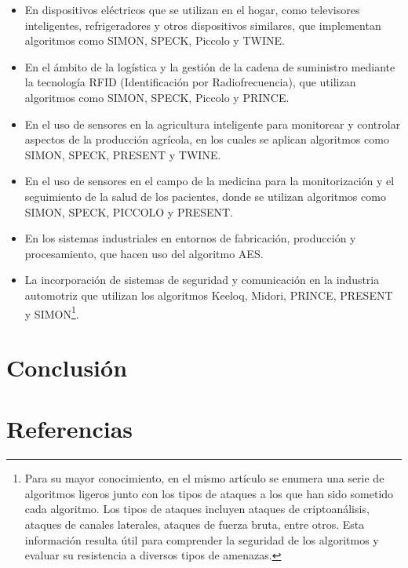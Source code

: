 \documentclass[a4paper,10pt]{article}
\begin{document}
	\begin{itemize}
		\item En dispositivos eléctricos que se utilizan en el hogar, como televisores inteligentes, refrigeradores y otros dispositivos similares, que implementan algoritmos como SIMON, SPECK, Piccolo y TWINE. 
		\item En el ámbito de la logística y la gestión de la cadena de suministro mediante la tecnología RFID (Identificación por Radiofrecuencia), que utilizan algoritmos como SIMON, SPECK, Piccolo y PRINCE.
		\item En el uso de sensores en la agricultura inteligente para monitorear y controlar aspectos de la producción agrícola, en los cuales se aplican algoritmos como SIMON, SPECK, PRESENT y TWINE.
		\item En el uso de sensores en el campo de la medicina para la monitorización y el seguimiento de la salud de los pacientes, donde se utilizan algoritmos como SIMON, SPECK, PICCOLO y PRESENT.
		\item En los sistemas industriales en entornos de fabricación, producción y procesamiento, que hacen uso del algoritmo AES.
		\item La incorporación de sistemas de seguridad y comunicación en la industria automotriz que utilizan los algoritmos Keeloq, Midori, PRINCE, PRESENT y SIMON\footnote{Para su mayor conocimiento, en el mismo artículo se enumera una serie de algoritmos ligeros junto con los tipos de ataques a los que han sido sometido cada algoritmo. Los tipos de ataques incluyen ataques de criptoanálisis, ataques de canales laterales, ataques de fuerza bruta, entre otros. Esta información resulta útil para comprender la seguridad de los algoritmos y evaluar su resistencia a diversos tipos de amenazas.}.
	\end{itemize}
	\newpage
	\section{Conclusión}
	
	\section{Referencias}
	\nocite{*}
	\printbibliography[heading=none]
\end{document}
